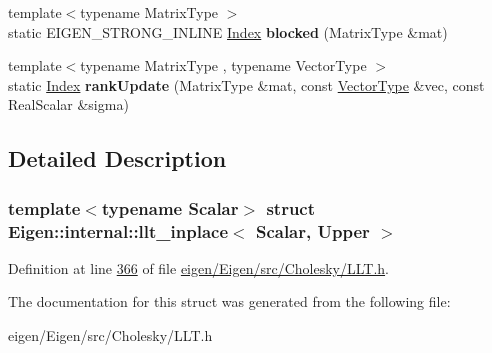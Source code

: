 \begin{DoxyCompactItemize}
\mbox{\label{struct_eigen_1_1internal_1_1llt__inplace_3_01_scalar_00_01_upper_01_4_a9d0bd12c1bf77e80e6d6d6b32fb19989}} 
{\footnotesize template$<$typename Matrix\+Type $>$ }\\static E\+I\+G\+E\+N\+\_\+\+S\+T\+R\+O\+N\+G\+\_\+\+I\+N\+L\+I\+NE \hyperlink{namespace_eigen_a62e77e0933482dafde8fe197d9a2cfde}{Index} {\bfseries blocked} (Matrix\+Type \&mat)
\item 
\mbox{\label{struct_eigen_1_1internal_1_1llt__inplace_3_01_scalar_00_01_upper_01_4_ab044cd63f44a77c7638ac58b772cec43}} 
{\footnotesize template$<$typename Matrix\+Type , typename Vector\+Type $>$ }\\static \hyperlink{namespace_eigen_a62e77e0933482dafde8fe197d9a2cfde}{Index} {\bfseries rank\+Update} (Matrix\+Type \&mat, const \hyperlink{struct_vector_type}{Vector\+Type} \&vec, const Real\+Scalar \&sigma)
\end{DoxyCompactItemize}


\subsection{Detailed Description}
\subsubsection*{template$<$typename Scalar$>$\newline
struct Eigen\+::internal\+::llt\+\_\+inplace$<$ Scalar, Upper $>$}



Definition at line \hyperlink{eigen_2_eigen_2src_2_cholesky_2_l_l_t_8h_source_l00366}{366} of file \hyperlink{eigen_2_eigen_2src_2_cholesky_2_l_l_t_8h_source}{eigen/\+Eigen/src/\+Cholesky/\+L\+L\+T.\+h}.



The documentation for this struct was generated from the following file\+:\begin{DoxyCompactItemize}
\item 
eigen/\+Eigen/src/\+Cholesky/\+L\+L\+T.\+h\end{DoxyCompactItemize}

